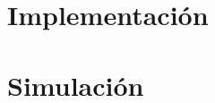 \documentclass{article}
\begin{document}
\newpage
\section{Implementación}


\section{Simulación}
\end{document}
